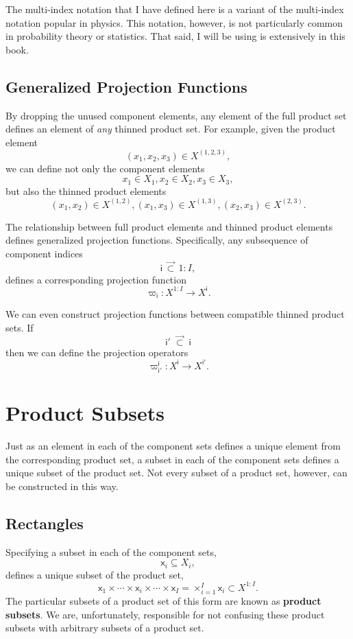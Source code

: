 \documentclass[
  letterpaper,
  DIV=11,
  numbers=noendperiod]{scrartcl}
\begin{document}
The multi-index notation that I have defined here is a variant of the
multi-index notation popular in physics. This notation, however, is not
particularly common in probability theory or statistics. That said, I
will be using is extensively in this book.

\subsection{Generalized Projection
Functions}\label{generalized-projection-functions}

By dropping the unused component elements, any element of the full
product set defines an element of \emph{any} thinned product set. For
example, given the product element \[
( x_{1}, x_{2}, x_{3} ) \in X^{(1, 2, 3)},
\] we can define not only the component elements \[
x_{1} \in X_{1}, x_{2} \in X_{2}, x_{3} \in X_{3},
\] but also the thinned product elements \[
( x_{1}, x_{2}  ) \in X^{(1, 2)},
( x_{1}, x_{3}  ) \in X^{(1, 3)},
( x_{2}, x_{3}  ) \in X^{(2, 3)}.
\]

The relationship between full product elements and thinned product
elements defines generalized projection functions. Specifically, any
subsequence of component indices \[
\mathsf{i} \, \vec{\subset} \, 1:I,
\] defines a corresponding projection function \[
\varpi_{ \mathsf{i} } : X^{1:I} \rightarrow X^{ \mathsf{i} }.
\]

We can even construct projection functions between compatible thinned
product sets. If \[
\mathsf{i}' \; \vec{\subset} \; \mathsf{i}
\] then we can define the projection operators \[
\varpi_{ \mathsf{i'} }^{ \mathsf{i} } :
X^{ \mathsf{i} } \rightarrow X^{ \mathsf{i}' }.
\]

\section{Product Subsets}\label{product-subsets}

Just as an element in each of the component sets defines a unique
element from the corresponding product set, a subset in each of the
component sets defines a unique subset of the product set. Not every
subset of a product set, however, can be constructed in this way.

\subsection{Rectangles}\label{sec:rect}

Specifying a subset in each of the component sets, \[
\mathsf{x}_{i} \subseteq X_{i},
\] defines a unique subset of the product set, \[
\mathsf{x}_{1} \times \cdots \times
\mathsf{x}_{i} \times \cdots \times
\mathsf{x}_{I}
=
\times_{i = 1}^{I} \mathsf{x}_{i}
\subset
X^{1:I}.
\] The particular subsets of a product set of this form are known as
\textbf{product subsets}. We are, unfortunately, responsible for not
confusing these product subsets with arbitrary subsets of a product set.
\end{document}
